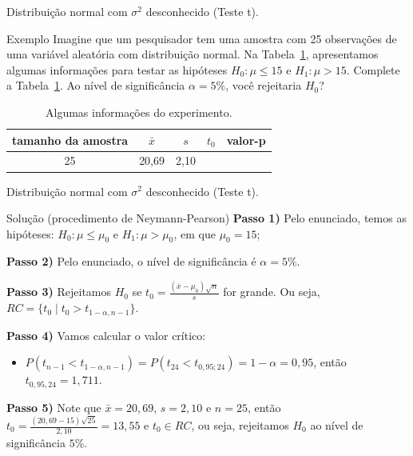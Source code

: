 \documentclass[8pt]{beamer}
\begin{document}
\begin{frame}{Distribuição normal com $\sigma^2$ desconhecido (Teste t).}

\Large

\begin{block}{Exemplo}
	Imagine que um pesquisador tem uma amostra com 25 observações de uma variável aleatória com distribuição normal. Na Tabela~\ref{tab:normal-s2-unknown-unilateral-h0-upper}, apresentamos algumas informações para testar as hipóteses $H_0: \mu \leq 15$ e $H_1: \mu > 15$. Complete a Tabela~\ref{tab:normal-s2-unknown-unilateral-h0-upper}. Ao nível de significância $\alpha=5\%$, você rejeitaria $H_0$?
	\begin{table}[ht]
		\centering
		\begin{tabular}{c|c|c|c|c}
			\toprule[0.05cm]
			tamanho da amostra & $\bar{x}$ & $s$ & $t_0$ & valor-p \\ 
			\midrule
			25 & 20,69 & 2,10 &  &  \\ 
			\bottomrule[0.05cm]
		\end{tabular}
		\caption{Algumas informações do experimento.} 
		\label{tab:normal-s2-unknown-unilateral-h0-upper}
	\end{table}
\end{block}

\normalsize

\end{frame}

\begin{frame}{Distribuição normal com $\sigma^2$ desconhecido (Teste t).}

\large

\begin{block}{Solução (procedimento de Neymann-Pearson)}
	\textbf{Passo 1)} Pelo enunciado, temos as hipóteses: $H_0: \mu \leq \mu_0$ e $H_1: \mu > \mu_0$, em que $\mu_0 = 15$;
	
	\textbf{Passo 2)} Pelo enunciado, o nível de significância é $\alpha=5\%$.
	
	\textbf{Passo 3)} Rejeitamos $H_0$ se $t_0 = \frac{(\bar{x} -\mu_0)\sqrt{n}}{s}$ for grande. Ou seja, $RC = \{ t_0 \mid t_0 > t_{1-\alpha, n-1} \}.$
	\vfill
	
	\textbf{Passo 4)} Vamos calcular o valor crítico:
	\begin{itemize}
		\item $P\left( t_{n-1} < t_{1-\alpha, n-1} \right) = P\left( t_{24} < t_{0,95; 24} \right) = 1- \alpha = 0,95$, então $t_{0,95, 24} = 1,711$.
	\end{itemize}
	\vfill

	\textbf{Passo 5)} Note que $\bar{x} = 20,69$, $s=2,10$ e $n=25$, então $t_0 = \frac{(20,69 - 15)\sqrt{25}}{2,10}=13,55$ e $t_0 \in RC$, ou seja, rejeitamos $H_0$ ao nível de significância $5\%$. 
\end{block}
\normalsize
\end{frame}
\end{document}
